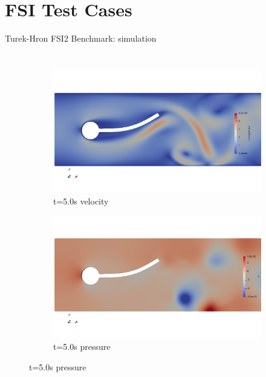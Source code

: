 \documentclass[10pt,t]{beamer}
\begin{document}
\section{FSI Test Cases}



\begin{frame}{Turek-Hron FSI2 Benchmark: simulation}

\begin{columns}


\begin{figure}[htb]
\vspace*{-0.8cm}
\centering %
\begin{subfigure}{0.5\textwidth}
  \includegraphics[width=\linewidth, trim=0 120 0 120, clip]{images/FSI2/fsi2_v1.png}
  \caption{t=5.0s velocity}
  \label{fig:fsi2_v1}
\end{subfigure}\hfil %
\begin{subfigure}{0.5\textwidth}
  \includegraphics[width=\linewidth, trim=0 120 0 120, clip]{images/FSI2/fsi2_p1.png}
  \caption{t=5.0s pressure}
  \label{fig:fsi2_p1}
\end{subfigure}\hfil %


\end{figure}
\end{columns}
\end{frame}
\end{document}
